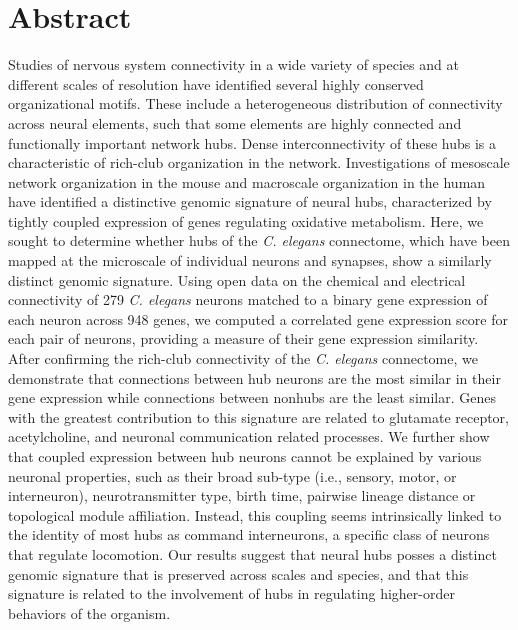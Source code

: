 \documentclass[10pt,letterpaper]{article}
\begin{document}
\section*{Abstract}
Studies of nervous system connectivity in a wide variety of species and at different scales of resolution have identified several highly conserved organizational motifs. 
These include a heterogeneous distribution of connectivity across neural elements, such that some elements are highly connected and functionally important network hubs.
Dense interconnectivity of these hubs is a characteristic of rich-club organization in the network. 
Investigations of mesoscale network organization in the mouse and macroscale organization in the human have identified a distinctive genomic signature of neural hubs, characterized by tightly coupled expression of genes regulating oxidative metabolism. 
Here, we sought to determine whether hubs of the \emph{C. elegans} connectome, which have been mapped at the microscale of individual neurons and synapses, show a similarly distinct genomic signature.
Using open data on the chemical and electrical connectivity of 279 \emph{C. elegans} neurons matched to a binary gene expression of each neuron across 948 genes, we computed a correlated gene expression score for each pair of neurons, providing a measure of their gene expression similarity.
After confirming the rich-club connectivity of the \emph{C. elegans} connectome, we demonstrate that connections between hub neurons are the most similar in their gene expression while connections between nonhubs are the least similar.
Genes with the greatest contribution to this signature are related to glutamate receptor, acetylcholine, and neuronal communication related processes.
We further show that coupled expression between hub neurons cannot be explained by various neuronal properties, such as their broad sub-type (i.e., sensory, motor, or interneuron), neurotransmitter type, birth time, pairwise lineage distance or topological module affiliation. 
Instead, this coupling seems intrinsically linked to the identity of most hubs as command interneurons, a specific class of neurons that regulate locomotion.
Our results suggest that neural hubs posses a distinct genomic signature that is preserved across scales and species, and that this signature is related to the involvement of hubs in regulating higher-order behaviors of the organism. 
\end{document}
